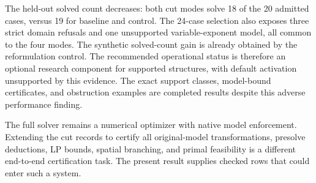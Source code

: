 \documentclass[11pt]{article}
\theoremstyle{definition}
\theoremstyle{remark}
\begin{document}
The held-out solved count decreases: both cut modes solve 18 of the 20
admitted cases, versus 19 for baseline and control. The 24-case
selection also exposes three strict domain refusals and one
unsupported variable-exponent model, all common to the four modes.
The synthetic solved-count gain is already obtained by the
reformulation control. The recommended operational status is
therefore an optional research component for supported structures,
with default activation unsupported by this evidence. The exact
support classes, model-bound certificates, and obstruction examples
are completed results despite this adverse performance finding.

The full solver remains a numerical optimizer with native model
enforcement. Extending the cut records to certify all original-model
transformations, presolve deductions, LP bounds, spatial branching, and
primal feasibility is a different end-to-end certification task. The
present result supplies checked rows that could enter such a system.



\end{document}
